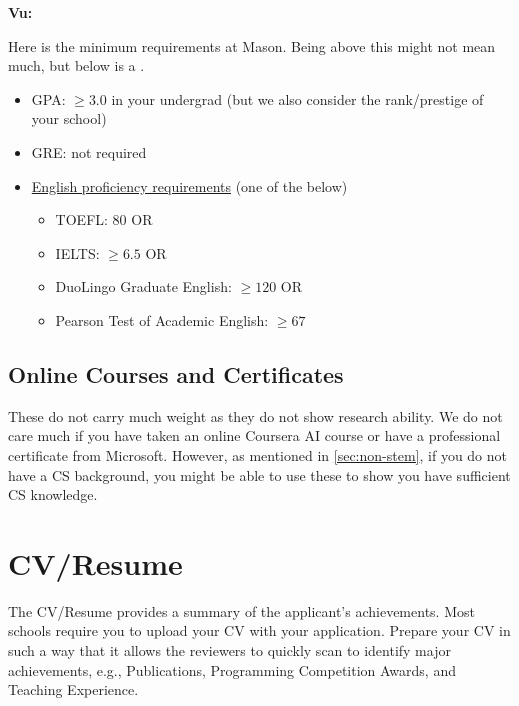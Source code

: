 \documentclass[oneside,11pt,dvipsnames]{book}
\newenvironment{commentbox}[1][]{
  \small
  \begin{mybox}
    {\small \textbf{#1}}
  }{
  \end{mybox}
}
\def\sectioninfo#1{%
  \addcontentsline{toc}{sectioninfo}{%
    \noexpand\numberline{}\color{black}{#1}}%
}
\newcommand{\red}[1]{{\color{red}{#1}}}
\begin{document}
\begin{commentbox}[Vu:]
  Here is the minimum requirements at Mason. 
  Being above this might not mean much, but below is a \red{red flag}.
  \begin{itemize}
    \item GPA: $\ge 3.0$ in your undergrad (but we also consider the rank/prestige of your school)
    \item GRE: not required 
    \item \href{https://www.gmu.edu/international/english-language-requirements}{English proficiency requirements} (one of the below)
          \begin{itemize}
            \item TOEFL: 80 OR
            \item IELTS: $\ge 6.5$ OR
            \item DuoLingo Graduate English: $\ge 120$ OR
            \item Pearson Test of Academic English: $\ge 67$
          \end{itemize}
  \end{itemize}
\end{commentbox}


\subsection{Online Courses and Certificates}

These do not carry much weight as they do not show research ability. We do not care much if you have taken an online Coursera AI course or have a professional certificate from Microsoft.
However, as mentioned in \autoref{sec:non-stem}, if you do not have a CS background, you might be able to use these to show you have sufficient CS knowledge.

\section{CV/Resume}
\sectioninfo{Highlight and summarize major achievements, e.g., Publications, Programming Awards}

The CV/Resume provides a summary of the applicant's achievements. Most schools require you to upload your CV with your application.
Prepare your CV in such a way that it allows the reviewers to quickly scan to identify major achievements, e.g., Publications, Programming Competition Awards, and Teaching Experience.
\end{document}
